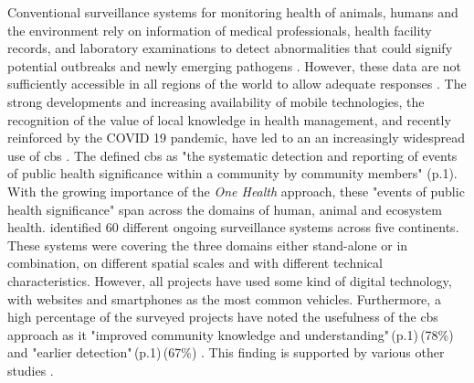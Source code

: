 Conventional surveillance systems for monitoring health of animals, humans and the environment rely on information of medical professionals, health facility records, and laboratory examinations to detect abnormalities that could signify potential outbreaks and newly emerging pathogens \autocite{mcneilLandscapeParticipatorySurveillance2022a}. However, these data are not sufficiently accessible in all regions of the world to allow adequate responses \autocite{mcneilLandscapeParticipatorySurveillance2022a,nikolayEvaluatingHospitalBasedSurveillance2017}. The strong developments and increasing availability of mobile technologies, the recognition of the value of local knowledge in health management, and recently reinforced by the COVID 19 pandemic, have led to an an increasingly widespread use of \acrshort{cbs} \autocite{kullenbergWhatCitizenScience2016,mcneilLandscapeParticipatorySurveillance2022a}. The \textcite{technicalcontributorstothejune2018whomeetingDefinitionCommunitybasedSurveillance2019} defined \acrshort{cbs} as "the systematic detection and reporting of events of public health significance within a community by community members" (p.1). With the growing importance of the \textit{One Health} approach, these "events of public health significance" \autocite{cdcOneHealthBasics2022} span across the domains of human, animal and ecosystem health.\newline
\Textcite{mcneilLandscapeParticipatorySurveillance2022a} identified 60 different ongoing surveillance systems across five continents. These systems were covering the three domains either stand-alone or in combination, on different spatial scales and with different technical characteristics. However, all projects have used some kind of digital technology, with websites and smartphones as the most common vehicles. Furthermore, a high percentage of the surveyed projects have noted the usefulness of the \acrshort{cbs} approach as it "improved community knowledge and understanding"\,(p.1)\,(78\%) and "earlier detection"\,(p.1)\,(67\%) \autocite{mcneilLandscapeParticipatorySurveillance2022a}. This finding is supported by various other studies \autocite{byrneCommunitycentredApproachGlobal2020,jarrettEvaluationPopulationMobility2020,mcgowanCommunitybasedSurveillanceInfectious2022,metugeHumanitarianLedCommunitybased2021,ratnayakeEarlyDetectionCholera2020,ratnayakePeoplecentredSurveillanceNarrative2020,technicalcontributorstothejune2018whomeetingDefinitionCommunitybasedSurveillance2019}.\newline
